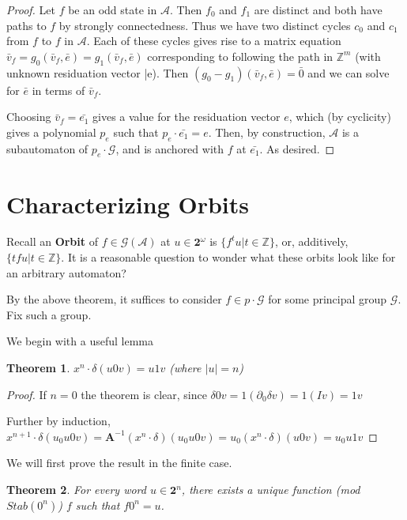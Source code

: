 \documentclass[12]{article}
\newcommand{\A}{\mathcal{A}}
\newcommand{\G}{\mathcal{G}}
\newcommand{\Z}{\mathbb{Z}}
\newcommand{\2}{\textbf{2}}
\newcommand{\Am}{\textbf{A}}
\newcommand{\del}{\partial}
\newcommand{\v}{\bar{v}}
\newtheorem{thm}{Theorem}
\begin{document}
\begin{proof}
  Let $f$ be an odd state in $\A$. Then $f_0$ and $f_1$ are distinct
  and both have paths to $f$ by strongly connectedness. Thus we have two
  distinct cycles $c_0$ and $c_1$ from $f$ to $f$ in $\A$.
  Each of these cycles gives rise to a matrix equation 
  $\v_f = g_0(\v_f,\bar{e}) = g_1(\v_f,\bar{e})$ corresponding to following
  the path in $\Z^m$ (with unknown residuation vector \bar{e}). 
  Then $(g_0 - g_1)(\v_f, \bar{e}) = \bar{0}$ and we can solve for 
  $\bar{e}$ in terms of $\v_f$.

  Choosing $\v_f = \bar{e_1}$ gives a value for the residuation vector $e$,
  which (by cyclicity) gives a polynomial $p_e$ 
  such that $p_e \cdot \bar{e_1} = e$. Then, by construction, $\A$ is 
  a subautomaton of $p_e \cdot \G$, and is anchored with $f$ at $\bar{e_1}$.
  As desired.
\end{proof}

\section{Characterizing Orbits}

Recall an \textbf{Orbit} of $f \in \G(\A)$ at $u \in \2^{\omega}$
is $\{ f^t u | t \in \Z \}$, or, additively, $\{ tf u | t \in \Z \}$.
It is a reasonable question to wonder what these orbits look like
for an arbitrary automaton?

By the above theorem, it suffices to consider $f \in p \cdot \G$
for some principal group $\G$. Fix such a group.

We begin with a useful lemma

\begin{thm}
  $x^n \cdot \delta (u0v) = u1v$ (where $|u| = n$)
\end{thm}

\begin{proof}
  If $n=0$ the theorem is clear, since 
  $\delta 0v = 1 (\del_0 \delta v) = 1 (I v) = 1v$

  Further by induction, 
  $x^{n+1} \cdot \delta (u_0u0v) = 
  \Am^{-1} (x^n \cdot \delta) (u_0u0v) =
  u_0 (x^n \cdot \delta) (u0v) =
  u_0u1v$
\end{proof}

We will first prove the result in the finite case.

\begin{thm}
  For every word $u \in \2^n$, there exists a unique function
  (mod $Stab(0^n)$) $f$ such that $f 0^n = u$.
\end{thm}
\end{document}
